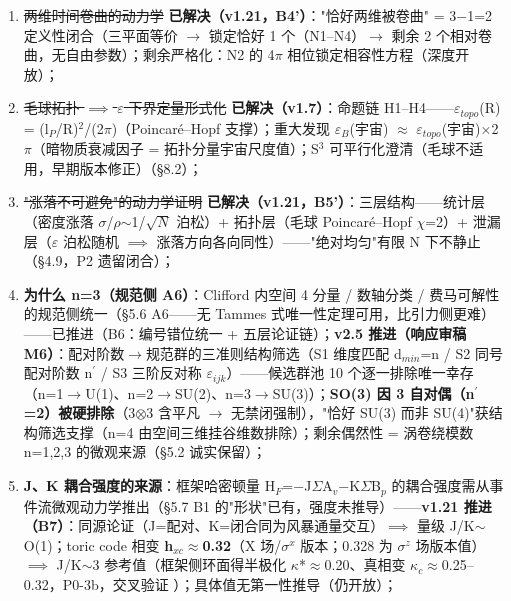 \documentclass[UTF8,fontset=windows]{csoarticle}
\newcommand{\up}[1]{\ensuremath{^{#1}}}
\newcommand{\down}[1]{\ensuremath{_{#1}}}
\begin{document}
\begin{enumerate}
\item \sout{两维时间卷曲的动力学} \textbf{\checkmark 已解决（v1.21，B4'）}："恰好两维被卷曲" = 3\ensuremath{-}1=2 定义性闭合（三平面等价 \ensuremath{\to} 锁定恰好 1 个（N1--N4）\ensuremath{\to} 剩余 2 个相对卷曲，无自由参数）；剩余严格化：N2 的 4\ensuremath{\pi} 相位锁定相容性方程（深度开放）；
\item \sout{毛球拓扑 \ensuremath{\implies} \ensuremath{\varepsilon} 下界定量形式化} \textbf{\checkmark 已解决（v1.7）}：命题链 H1--H4------\ensuremath{\varepsilon}\down{topo}(R) = (l\down{P}/R)\up{2}/(2\ensuremath{\pi})（Poincar\'{e}--Hopf 支撑）；重大发现 \ensuremath{\varepsilon}\down{B}(宇宙) \ensuremath{\approx} \ensuremath{\varepsilon}\down{topo}(宇宙)\ensuremath{\times}2\ensuremath{\pi}（暗物质衰减因子 = 拓扑分量宇宙尺度值）；S\up{3} 可平行化澄清（毛球不适用，早期版本修正）（\S{}8.2）；
\item \sout{"涨落不可避免"的动力学证明} \textbf{\checkmark 已解决（v1.21，B5'）}：三层结构------统计层（密度涨落 \ensuremath{\sigma}/\ensuremath{\rho}\ensuremath{\sim}1/\ensuremath{\sqrt{N}} 泊松）+ 拓扑层（毛球 Poincar\'{e}--Hopf \ensuremath{\chi}=2）+ 泄漏层（\ensuremath{\varepsilon} 泊松随机 \ensuremath{\implies} 涨落方向各向同性）------"绝对均匀"有限 N 下不静止（\S{}4.9，P2 遗留闭合）；
\item \textbf{为什么 n=3（规范侧 A6）}：Clifford 内空间 4 分量 / 数轴分类 / 费马可解性的规范侧统一（\S{}5.6 A6------无 Tammes 式唯一性定理可用，比引力侧更难）------\checkmark 已推进（B6：编号错位统一 + 五层论证链）；\textbf{v2.5 推进（响应审稿 M6）}：配对阶数\ensuremath{\to}规范群的三准则结构筛选（S1 维度匹配 d\down{min}=n / S2 同号配对阶数 n\ensuremath{^\prime} / S3 三阶反对称 \ensuremath{\varepsilon}\down{ijk}）------候选群池 10 个逐一排除唯一幸存（n=1\ensuremath{\to}U(1)、n=2\ensuremath{\to}SU(2)、n=3\ensuremath{\to}SU(3)）；\textbf{SO(3) 因 3 自对偶（n\ensuremath{^\prime}=2）被硬排除}（3\ensuremath{\otimes}3 含平凡 \ensuremath{\to} 无禁闭强制），"恰好 SU(3) 而非 SU(4)"获结构筛选支撑（n=4 由空间三维挂谷维数排除）；剩余偶然性 = 涡卷绕模数 n=1,2,3 的微观来源（\S{}5.2 诚实保留）；
\item \textbf{J、K 耦合强度的来源}：框架哈密顿量 H\down{F}=\ensuremath{-}J\ensuremath{\Sigma}A\down{v}\ensuremath{-}K\ensuremath{\Sigma}B\down{p} 的耦合强度需从事件流微观动力学推出（\S{}5.7 B1 的"形状"已有，强度未推导）------\textbf{v1.21 推进（B7）}：同源论证（J=配对、K=闭合同为风暴通量交互）\ensuremath{\implies} 量级 J/K\ensuremath{\sim}O(1)；toric code 相变 \textbf{h\down{xc}\ensuremath{\approx}0.32}（X 场/\ensuremath{\sigma}\up{x} 版本；0.328 为 \ensuremath{\sigma}\up{z} 场版本值）\ensuremath{\implies} J/K\ensuremath{\sim}3 参考值（框架侧环面得半极化 \ensuremath{\kappa}*\ensuremath{\approx}0.20、真相变 \ensuremath{\kappa}\down{c}\ensuremath{\approx}0.25--0.32，P0-3b，交叉验证 \checkmark）；具体值无第一性推导（仍开放）；

\end{enumerate}
\end{document}
